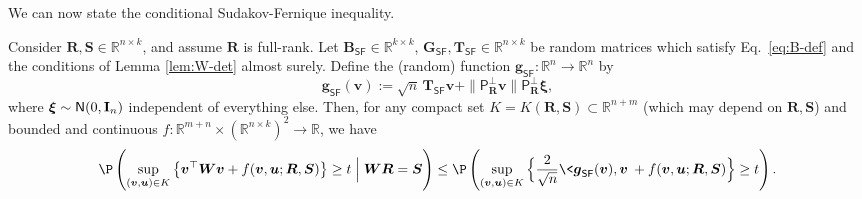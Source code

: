 \documentclass[]{article}
\def\bR{{\boldsymbol R}}
\def\Id{{\mathbf I}}
\def\bW{{\boldsymbol W}}
\def\normal{{\sf N}}
\def\bv{{\boldsymbol V}}
\def\bT{\boldsymbol{T}}
\def\bS{\boldsymbol{S}}
\def\proj{{\mathsf P}}
\def\bB{{\boldsymbol B}}
\def\bu{{\boldsymbol u}}
\def\bg{{\boldsymbol g}}
\def\bv{{\boldsymbol v}}
\def\bxi{{\boldsymbol \xi}}
\def\reals{{\mathbb R}}
\def\bW{{\boldsymbol W}}
\def\bG{{\boldsymbol G}}
\def\bv{{\boldsymbol v}}
\def\proj{{\mathsf P}}
\def\normal{{\sf N}}
\def\bu{{\boldsymbol u}}
\def\bg{{\boldsymbol g}}
\def\SF{\mathsf{SF}}
\begin{document}
We can now state the conditional Sudakov-Fernique inequality.
\begin{theorem}
\label{thm:cond-SF}
    Consider $\bR,\bS \in \reals^{n \times k}$,
    and assume $\bR$ is full-rank.
    Let $\bB_{\SF} \in \reals^{k \times k}$, $\bG_{\SF},\bT_{\SF} \in \reals^{n \times k}$ be random matrices which satisfy Eq.~\eqref{eq:B-def} and the conditions of Lemma \ref{lem:W-det} almost surely.
    Define the (random) function $\bg_{\SF}: \reals^n \rightarrow \reals^n$ by
    \begin{equation}
    \label{eq:def-gSF}
        \bg_{\SF}(\bv) 
            := 
            \sqrt{n} \, \bT_{\SF} \bv + \| \proj_{\bR}^\perp \bv \| \proj_{\bR}^\perp \bxi,
    \end{equation}
    where $\bxi \sim \normal(0,\Id_n)$ independent of everything else.
    Then, for any compact set $K = K(\bR,\bS) \subset \reals^{n + m}$ (which may depend on $\bR,\bS$) and bounded and continuous $f:\reals^{m+n} \times (\reals^{n\times k})^2 \rightarrow \reals$,
    we have
    \begin{equation}
        \P\left(
            \sup_{(\bv,\bu) \in K} \big\{ \bv^\top \bW \bv + f(\bv,\bu; \bR,\bS) \big\} \geq t 
            \Bigm|
            \bW\bR = \bS
        \right)
        \leq 
        \P\left(
            \sup_{(\bv,\bu) \in K} \Big\{ \frac2{\sqrt{n}}\< \bg_{\SF}(\bv),\bv\> + f(\bv,\bu;\bR,\bS) \Big\} \geq t 
        \right).
    \end{equation}
\end{theorem}
\end{document}

